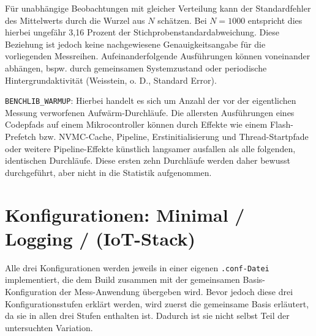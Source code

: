 F{\"u}r unabh{\"a}ngige Beobachtungen mit gleicher Verteilung kann der Standardfehler des Mittelwerts durch die Wurzel aus \(N\) sch{\"a}tzen. Bei \(N=1000\) entspricht dies hierbei ungef{\"a}hr 3,16 Prozent der Stichprobenstandardabweichung. Diese Beziehung ist jedoch keine nachgewiesene Genauigkeitsangabe f{\"u}r die vorliegenden Messreihen. Aufeinanderfolgende Ausf{\"u}hrungen k{\"o}nnen voneinander abh{\"a}ngen, bspw. durch gemeinsamen Systemzustand oder periodische Hintergrundaktivit{\"a}t (Weisstein, o. D., \glqq{}Standard Error\grqq{}).

\lstinline[style=fileinline]|BENCHLIB_WARMUP|: Hierbei handelt es sich um Anzahl der vor der eigentlichen Messung verworfenen \glqq{}Aufw{\"a}rm\grqq{}-Durchl{\"a}ufe. Die allersten Ausf{\"u}hrungen eines Codepfads auf einem Mikrocontroller k{\"o}nnen durch Effekte wie einem Flash-Prefetch bzw. NVMC-Cache, Pipeline, Erstinitialisierung und Thread-Startpfade oder weitere Pipeline-Effekte k{\"u}nstlich langsamer ausfallen als alle folgenden, identischen Durchl{\"a}ufe. Diese ersten zehn Durchl{\"a}ufe werden daher bewusst durchgef{\"u}hrt, aber nicht in die Statistik aufgenommen.

\section{Konfigurationen: Minimal / Logging / (IoT-Stack)}
Alle drei Konfigurationen werden jeweils in einer eigenen \lstinline[style=fileinline]|.conf-Datei| implementiert, die dem Build zusammen mit der gemeinsamen Basis-Konfiguration der Mess-Anwendung {\"u}bergeben wird. Bevor jedoch diese drei Konfigurationsstufen erkl{\"a}rt werden, wird zuerst die gemeinsame Basis erl{\"a}utert, da sie in allen drei Stufen enthalten ist. Dadurch ist sie nicht selbst Teil der untersuchten Variation.

